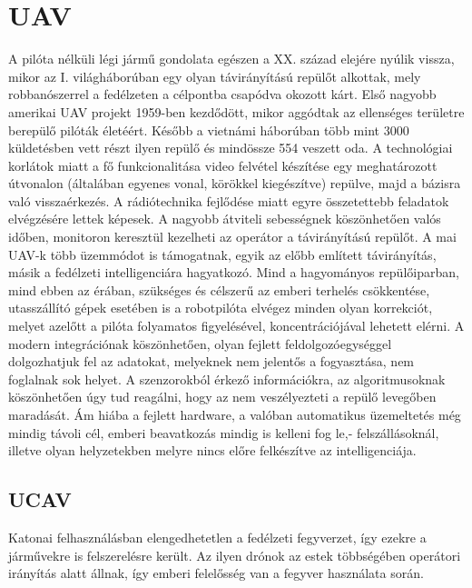 \documentclass[12pt]{article}
\begin{document}
\section{UAV}
\cite{bib:uav}A pilóta nélküli légi járm\H{u} gondolata egészen a XX. század elejére nyúlik vissza, mikor az I. világháborúban egy olyan távirányítású repül\H{o}t alkottak, mely robbanószerrel a fedélzeten a célpontba csapódva okozott kárt.
\cite{bib:sperry}Els\H{o} nagyobb amerikai UAV projekt 1959-ben kezd\H{o}dött, mikor aggódtak az ellenséges területre berepül\H{o} pilóták életéért. Kés\H{o}bb a vietnámi háborúban több mint 3000 küldetésben vett részt ilyen repül\H{o} és mindössze 554 veszett oda. A technológiai korlátok miatt a f\H{o} funkcionalitása video felvétel készítése egy meghatározott útvonalon (általában egyenes vonal, körökkel kiegészítve) repülve, majd a bázisra való visszaérkezés. 
A rádiótechnika fejl\H{o}dése miatt egyre összetettebb feladatok elvégzésére lettek képesek. A nagyobb átviteli sebességnek köszönhet\H{o}en valós id\H{o}ben, monitoron keresztül kezelheti az operátor a távirányítású repül\H{o}t. A mai UAV-k több üzemmódot is támogatnak, egyik az el\H{o}bb említett távirányítás, másik a fedélzeti intelligenciára hagyatkozó. Mind a hagyományos repül\H{o}iparban, mind ebben az érában, szükséges és célszer\H{u} az emberi terhelés csökkentése, utasszállító gépek esetében is a robotpilóta elvégez minden olyan korrekciót, melyet azel\H{o}tt a pilóta folyamatos figyelésével, koncentrációjával lehetett elérni. A modern integrációnak köszönhet\H{o}en, olyan fejlett feldolgozóegységgel dolgozhatjuk fel az adatokat, melyeknek nem jelent\H{o}s a fogyasztása, nem foglalnak sok helyet. A szenzorokból érkez\H{o} információkra, az algoritmusoknak köszönhet\H{o}en úgy tud reagálni, hogy az nem veszélyezteti a repül\H{o} leveg\H{o}ben maradását. Ám hiába a fejlett hardware, a valóban automatikus üzemeltetés még mindig távoli cél, emberi beavatkozás mindig is kelleni fog le,- felszállásoknál, illetve olyan helyzetekben melyre nincs el\H{o}re felkészítve az intelligenciája.


\subsection{UCAV}
\cite{bib:ucav}Katonai felhasználásban elengedhetetlen a fedélzeti fegyverzet, így ezekre a járm\H{u}vekre is felszerelésre került. Az ilyen drónok az estek többségében operátori irányítás alatt állnak, így emberi felel\H{o}sség van a fegyver használata során.
\end{document}
